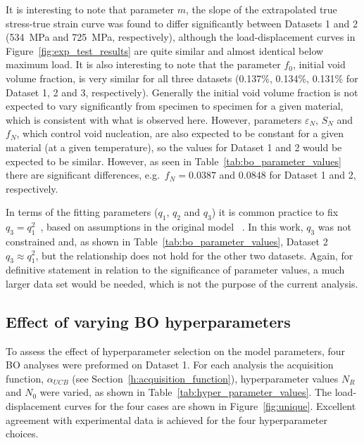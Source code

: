 \documentclass[preprint, review, 12pt]{elsarticle}
\begin{document}
	It is interesting to note that parameter $m$, the slope of the extrapolated true stress-true strain curve was found to differ significantly between Datasets 1 and 2 (534~MPa and 725~MPa, respectively), although the load-displacement curves in Figure~\ref{fig:exp_test_results} are quite similar and almost identical below maximum load.
	It is also interesting to note that the parameter $f_0$, initial void volume fraction, is very similar for all three datasets (0.137\%, 0.134\%, 0.131\% for Dataset 1, 2 and 3, respectively).
	Generally the initial void volume fraction is not expected to vary significantly from specimen to specimen for a given material, which is consistent with what is observed here.
	However, parameters $\varepsilon_N$, $S_N$ and $f_N$, which control void nucleation, are also expected to be constant for a given material (at a given temperature), so the values for Dataset 1 and 2 would be expected to be similar.
	However, as seen in Table~\ref{tab:bo_parameter_values} there are significant differences, e.g.\ $f_N = 0.0387$ and $0.0848$ for Dataset 1 and 2, respectively.

	In terms of the fitting parameters ($q_1$, $q_2$ and $q_3$) it is common practice to fix $q_3 = q_1^2$~\cite{ABBASI2011,ROUSSELIER2019, YAN2021}, based on assumptions in the original model ~\cite{TVERGAARD1981a}.
	In this work, $q_3$ was not constrained and, as shown in Table~\ref{tab:bo_parameter_values}, Dataset 2 $q_3\approx q_1^2$, but the relationship does not hold for the other two datasets.
	Again, for definitive statement in relation to the significance of parameter values, a much larger data set would be needed, which is not the purpose of the current analysis.

	\subsection{Effect of varying BO hyperparameters}
	\label{h:unique}

	To assess the effect of hyperparameter selection on the model parameters, four BO analyses were preformed on Dataset 1.
	For each analysis the acquisition function, $\alpha_{UCB}$ (see Section~\ref{h:acquisition_function}), hyperparameter values $N_R$ and $N_0$ were varied, as shown in Table~\ref{tab:hyper_parameter_values}.
	The load-displacement curves for the four cases are shown in Figure~\ref{fig:unique}.
	Excellent agreement with experimental data is achieved for the four hyperparameter choices.
\end{document}

